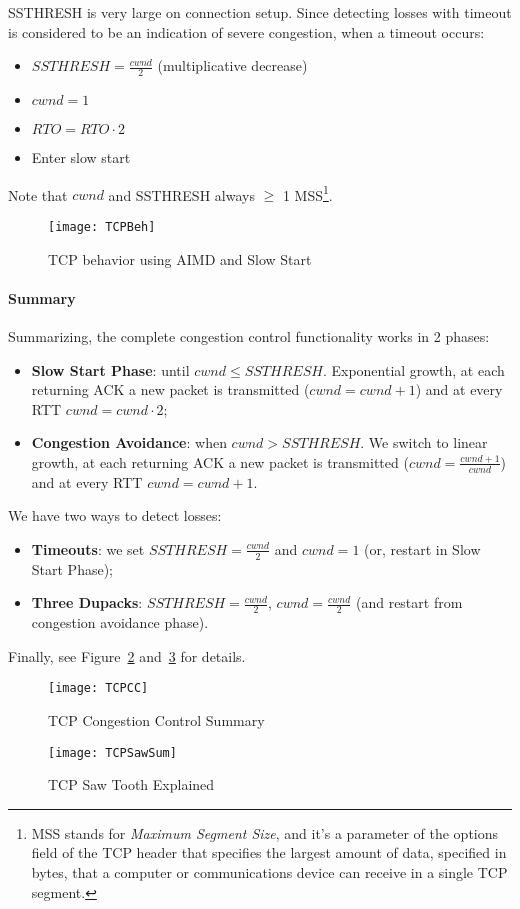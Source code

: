 SSTHRESH is very large on connection setup.
Since detecting losses with timeout is considered to be an indication 
of severe congestion, when a timeout occurs:	
\begin{itemize}
  \item $SSTHRESH = \frac{cwnd}{2}$ (multiplicative decrease)
  \item $cwnd=1$
  \item $RTO=RTO \cdot 2$
  \item Enter slow start
\end{itemize}

Note that $cwnd$ and SSTHRESH always $\ge$ 1 MSS\footnote{
MSS stands for \textit{Maximum Segment Size}, and it's a parameter of the
options field of the TCP header that specifies the largest amount of data,
specified in bytes, that a computer or communications device can receive in a
single TCP segment.
}. 

\begin{figure}[t]
  \centering
  \texttt{[image: TCPBeh]}
  \caption{TCP behavior using AIMD and Slow Start}			
  \label{fig:tcp:TCPBeh}
\end{figure}

\paragraph*{Summary}
Summarizing, the complete congestion control functionality works in 2 phases:
\begin{itemize}
  \item \textbf{Slow Start Phase}: until $cwnd \le SSTHRESH$.
Exponential growth, at each returning ACK a new packet is transmitted 
($cwnd=cwnd+1$) and at every RTT $cwnd=cwnd \cdot 2$; 
  \item \textbf{Congestion Avoidance}: when $cwnd > SSTHRESH$. We 
switch to linear growth, at each returning ACK a new packet is transmitted 
($cwnd=\frac{cwnd+1}{cwnd}$) and at every RTT $cwnd=cwnd+1$.
\end{itemize}
	
We have two ways to detect losses: 
\begin{itemize}
  \item \textbf{Timeouts}: we set $SSTHRESH=\frac{cwnd}{2}$ and $cwnd=1$
(or, restart in Slow Start Phase);
  \item \textbf{Three Dupacks}: $SSTHRESH=\frac{cwnd}{2}$, $cwnd=\frac{cwnd}{2}$
(and restart from congestion avoidance phase).		 
\end{itemize}
	
Finally, see Figure~\ref{fig:tcp:TCPCC} and~\ref{fig:tcp:TCPSawSum} for details.
	
\begin{figure}[t]
  \centering
  \texttt{[image: TCPCC]}
  \caption{TCP Congestion Control Summary}
  \label{fig:tcp:TCPCC}
\end{figure}

\begin{figure}[t]
  \centering
  \texttt{[image: TCPSawSum]}
  \caption{TCP Saw Tooth Explained}
  \label{fig:tcp:TCPSawSum}
\end{figure}
